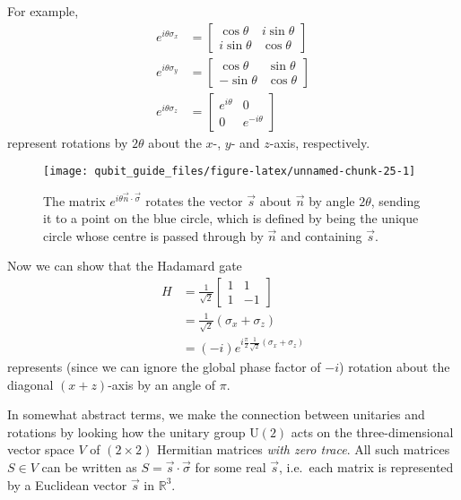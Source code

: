 \documentclass[fleqn]{article}
\begin{document}
For example,
\[
  \begin{aligned}
    e^{i\theta\sigma_x}
    &=
    \begin{bmatrix}
      \cos\theta & i\sin\theta
    \\i\sin\theta & \cos\theta
    \end{bmatrix}
  \\e^{i\theta\sigma_y}
    &=
    \begin{bmatrix}
      \cos\theta & \sin\theta
    \\-\sin\theta & \cos\theta
    \end{bmatrix}
  \\e^{i\theta\sigma_z}
    &= \begin{bmatrix}e^{i\theta}&0\\0&e^{-i\theta}\end{bmatrix}
  \end{aligned}
\]
represent rotations by \(2\theta\) about the \(x\)-, \(y\)- and \(z\)-axis, respectively.



\begin{figure}[H]

{\centering \texttt{[image: qubit\_guide\_files/figure-latex/unnamed-chunk-25-1]} 

}

\caption{The matrix \(e^{i\theta\vec{n}\cdot\vec{\sigma}}\) rotates the vector \(\vec{s}\) about \(\vec{n}\) by angle \(2\theta\), sending it to a point on the blue circle, which is defined by being the unique circle whose centre is passed through by \(\vec{n}\) and containing \(\vec{s}\).}\label{fig:unnamed-chunk-25}
\end{figure}

Now we can show that the Hadamard gate
\[
  \begin{aligned}
    H
    &= \frac{1}{\sqrt{2}}
    \begin{bmatrix}
      1& 1
    \\1 & -1
    \end{bmatrix}
  \\&= \frac{1}{\sqrt{2}}(\sigma_x + \sigma_z)
  \\&= (-i)e^{i \frac{\pi}{2} \frac{1}{\sqrt{2}}(\sigma_x+\sigma_z)}
  \end{aligned}
\]
represents (since we can ignore the global phase factor of \(-i\)) rotation about the diagonal \((x+z)\)-axis by an angle of \(\pi\).

In somewhat abstract terms, we make the connection between unitaries and rotations by looking how the unitary group \(\mathrm{U}(2)\) acts on the three-dimensional vector space \(V\) of \((2\times 2)\) Hermitian matrices \emph{with zero trace}.
All such matrices \(S\in V\) can be written as \(S=\vec{s}\cdot\vec{\sigma}\) for some real \(\vec{s}\), i.e.~each matrix is represented by a Euclidean vector \(\vec{s}\) in \(\mathbb{R}^3\).
\end{document}
